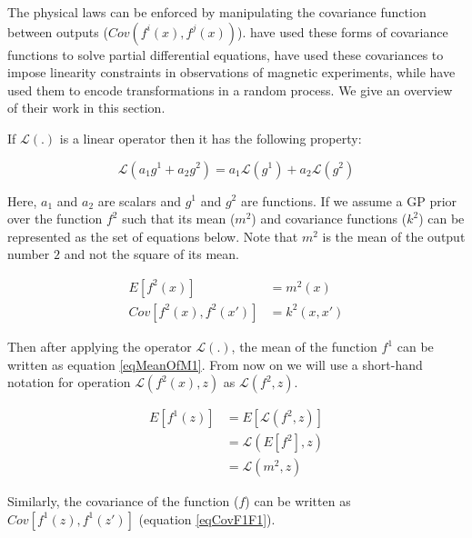 The physical laws can be enforced by manipulating the covariance function between outputs ($Cov(f^i(x), f^j(x))$). \cite{journals/jmlr/AlvarezLL09, sarkka2011linear} have used these forms of covariance functions to solve partial differential equations, \cite{jidling2017linearly} have used these covariances to impose linearity constraints in observations of magnetic experiments, while \cite{ginsbourger2013invariances} have used them to encode transformations in a random process. We give an overview of their work in this section. 

If $\mathcal{L} (.)$ is a linear operator then it has the following property:

\begin{equation}
    \mathcal{L} (a_1g^1 + a_2g^2) = a_1\mathcal{L}(g^1) + a_2\mathcal{L}(g^2) 
\end{equation}

Here, $a_1$ and $a_2$ are scalars and $g^1$ and $g^2$ are functions. If we assume a GP prior over the function $f^2$ such that its mean ($m^2$) and covariance functions ($k^2$) can be represented as the set of equations below. Note that $m^2$ is the mean of the output number $2$ and not the square of its mean.

\begin{align}
E[f^2(x)] & = m^2(x) \\
Cov[f^2(x), f^2(x')] & = k^2(x, x')
\end{align}

Then after applying the operator $\mathcal{L}(.)$, the mean of the function $f^1$ can be written as equation \ref{eqMeanOfM1}. From now on we will use a short-hand notation for operation $\mathcal{L}\left ( f^{2}(x), z \right )$ as $\mathcal{L}\left ( f^{2}, z \right )$.

\begin{equation}\label{eqMeanOfM1}
\begin{aligned}
E[f^1(z)]   & = E[\mathcal{L}\left ( f^{2}, z \right )] \\
            & = \mathcal{L}(E[f^{2}], z) \\
            & = \mathcal{L}(m^2, z)
\end{aligned}
\end{equation}

Similarly, the covariance of the function ($f$) can be written as $Cov[f^1(z), f^1(z')]$ (equation \ref{eqCovF1F1}). 

